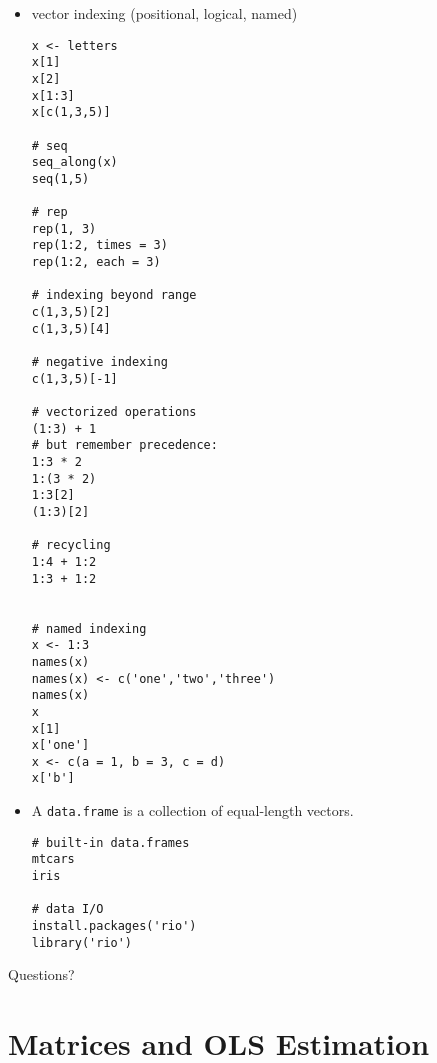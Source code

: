 \documentclass[a4paper,12pt]{article}
\begin{document}
\begin{itemize}
\begin{lstlisting}
TRUE | TRUE
TRUE | FALSE
FALSE | FALSE
TRUE & TRUE
TRUE & FALSE
FALSE & FALSE

!TRUE
!FALSE

TRUE | 1L
FALSE | 1L
TRUE | 0L

TRUE + TRUE
TRUE - FALSE

TRUE - (2*TRUE)


# equality
1 == 1
1 == 1L
TRUE == 1L
2 == 3
2 == TRUE

1 != 1
1 != 0
TRUE != 3

4 %in% 1:5
3:5 %in% c(2,4,6)
!3:5 %in% c(2,4,6)
\end{lstlisting}



\item vector indexing (positional, logical, named)

\begin{lstlisting}
x <- letters
x[1]
x[2]
x[1:3]
x[c(1,3,5)]

# seq
seq_along(x)
seq(1,5)

# rep
rep(1, 3)
rep(1:2, times = 3)
rep(1:2, each = 3)

# indexing beyond range
c(1,3,5)[2]
c(1,3,5)[4]

# negative indexing
c(1,3,5)[-1]

# vectorized operations
(1:3) + 1
# but remember precedence:
1:3 * 2
1:(3 * 2)
1:3[2]
(1:3)[2]

# recycling
1:4 + 1:2
1:3 + 1:2


# named indexing
x <- 1:3
names(x)
names(x) <- c('one','two','three')
names(x)
x
x[1]
x['one']
x <- c(a = 1, b = 3, c = d)
x['b']

\end{lstlisting}


\item A \texttt{data.frame} is a collection of equal-length vectors.

\begin{lstlisting}
# built-in data.frames
mtcars
iris

# data I/O
install.packages('rio')
library('rio')
\end{lstlisting}

\end{itemize}

Questions?



\section{Matrices and OLS Estimation}
\end{document}
